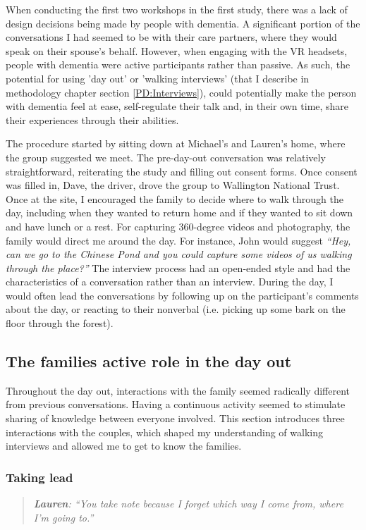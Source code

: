When conducting the first two workshops in the first study, there was a lack of design decisions being made by people with dementia. A significant portion of the conversations I had seemed to be with their care partners, where they would speak on their spouse's behalf. However, when engaging with the VR headsets, people with dementia were active participants rather than passive. As such, the potential for using 'day out' or 'walking interviews' (that I describe in methodology chapter section \ref{PD:Interviews}), could potentially make the person with dementia feel at ease, self-regulate their talk and, in their own time, share their experiences through their abilities.

The procedure started by sitting down at Michael's and Lauren's home, where the group suggested we meet. The pre-day-out conversation was relatively straightforward, reiterating the study and filling out consent forms. Once consent was filled in, Dave, the driver, drove the group to Wallington National Trust. Once at the site, I encouraged the family to decide where to walk through the day, including when they wanted to return home and if they wanted to sit down and have lunch or a rest. For capturing 360-degree videos and photography, the family would direct me around the day. For instance, John would suggest \textit{``Hey, can we go to the Chinese Pond and you could capture some videos of us walking through the place?''} The interview process had an open-ended style and had the characteristics of a conversation rather than an interview. During the day, I would often lead the conversations by following up on the participant's comments about the day, or reacting to their nonverbal (i.e. picking up some bark on the floor through the forest).

\subsection{The families active role in the day out}
\label{ActiveRole}
Throughout the day out, interactions with the family seemed radically different from previous conversations. Having a continuous activity seemed to stimulate sharing of knowledge between everyone involved. This section introduces three interactions with the couples, which shaped my understanding of walking interviews and allowed me to get to know the families.


\subsubsection{Taking lead}
\begin{quote}
\textit{   \textbf{Lauren}: ``You take note because I forget which way I come from, where I'm going to.''
}\end{quote}

